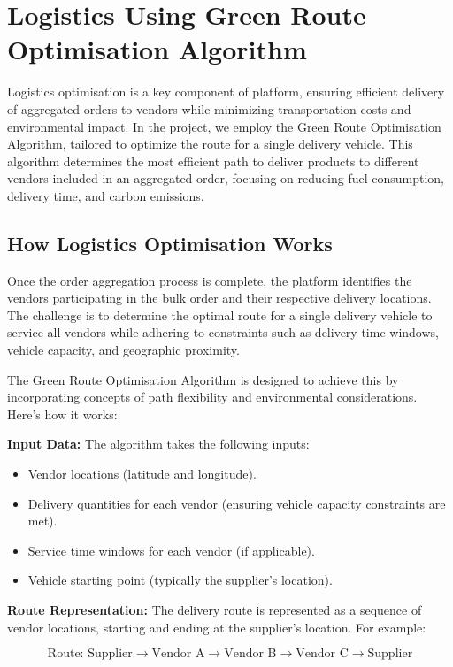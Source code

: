 \section{Logistics Using Green Route Optimisation Algorithm}

Logistics optimisation is a key component of platform, ensuring efficient delivery of aggregated orders to vendors while minimizing transportation costs and environmental impact. In the project, we employ the Green Route Optimisation Algorithm, tailored to optimize the route for a single delivery vehicle. This algorithm determines the most efficient path to deliver products to different vendors included in an aggregated order, focusing on reducing fuel consumption, delivery time, and carbon emissions.

\subsection{How Logistics Optimisation Works}

Once the order aggregation process is complete, the platform identifies the vendors participating in the bulk order and their respective delivery locations. The challenge is to determine the optimal route for a single delivery vehicle to service all vendors while adhering to constraints such as delivery time windows, vehicle capacity, and geographic proximity.

The Green Route Optimisation Algorithm is designed to achieve this by incorporating concepts of path flexibility and environmental considerations. Here's how it works:

\textbf{Input Data:}
The algorithm takes the following inputs:
\begin{itemize}
    \item Vendor locations (latitude and longitude).
    \item Delivery quantities for each vendor (ensuring vehicle capacity constraints are met).
    \item Service time windows for each vendor (if applicable).
    \item Vehicle starting point (typically the supplier's location).
\end{itemize}

\textbf{Route Representation:}
The delivery route is represented as a sequence of vendor locations, starting and ending at the supplier's location. For example:

\[
    \text{Route: Supplier} \rightarrow \text{Vendor A} \rightarrow \text{Vendor B} \rightarrow \text{Vendor C} \rightarrow \text{Supplier}
\]

